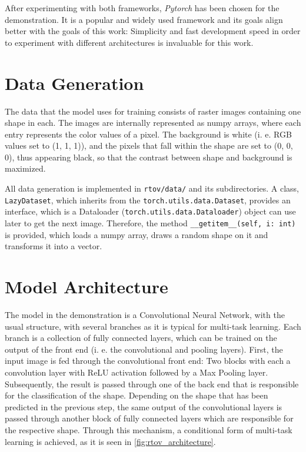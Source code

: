 \documentclass[12pt, a4paper, titlepage]{report}
\begin{document}
After experimenting with both frameworks, \emph{Pytorch} has been chosen for the demonstration. It is a popular and widely used framework and its goals align better with the goals of this work: Simplicity and fast development speed in order to experiment with different architectures is invaluable for this work.
\vspace{0.5cm}

\section{Data Generation}

The data that the model uses for training consists of raster images containing one shape in each. The images are internally represented as numpy arrays, where each entry represents the color values of a pixel. The background is white (i. e. RGB values set to (1, 1, 1)), and the pixels that fall within the shape are set to (0, 0, 0), thus appearing black, so that the contrast between shape and background is maximized.

All data generation is implemented in \lstinline{rtov/data/} and its subdirectories. A class, \lstinline{LazyDataset}, which inherits from the \lstinline{torch.utils.data.Dataset}, provides an interface, which is a Dataloader (\lstinline{torch.utils.data.Dataloader}) object can use later to get the next image. Therefore, the method \lstinline{__getitem__(self, i: int)} is provided, which loads a numpy array, draws a random shape on it and transforms it into a vector.

\section{Model Architecture}

The model in the demonstration is a Convolutional Neural Network, with the usual structure, with several branches as it is typical for multi-task learning. Each branch is a collection of fully connected layers, which can be trained on the output of the front end (i. e. the convolutional and pooling layers).
First, the input image is fed through the convolutional front end: Two blocks with each a convolution layer with ReLU activation followed by a Max Pooling layer. Subsequently, the result is passed through one of the back end that is responsible for the classification of the shape. Depending on the shape that has been predicted in the previous step, the same output of the convolutional layers is passed through another block of fully connected layers which are responsible for the respective shape. Through this mechanism, a conditional form of multi-task learning is achieved, as it is seen in \ref{fig:rtov_architecture}.
\end{document}

